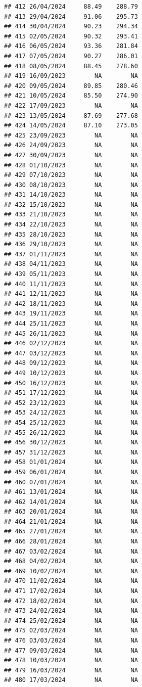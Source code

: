 \documentclass[
]{article}
\begin{document}
\begin{verbatim}
## 412 26/04/2024     88.49    288.79
## 413 29/04/2024     91.06    295.73
## 414 30/04/2024     90.23    294.34
## 415 02/05/2024     90.32    293.41
## 416 06/05/2024     93.36    281.84
## 417 07/05/2024     90.27    286.01
## 418 08/05/2024     88.45    278.60
## 419 16/09/2023        NA        NA
## 420 09/05/2024     89.85    280.46
## 421 10/05/2024     85.50    274.90
## 422 17/09/2023        NA        NA
## 423 13/05/2024     87.69    277.68
## 424 14/05/2024     87.10    273.05
## 425 23/09/2023        NA        NA
## 426 24/09/2023        NA        NA
## 427 30/09/2023        NA        NA
## 428 01/10/2023        NA        NA
## 429 07/10/2023        NA        NA
## 430 08/10/2023        NA        NA
## 431 14/10/2023        NA        NA
## 432 15/10/2023        NA        NA
## 433 21/10/2023        NA        NA
## 434 22/10/2023        NA        NA
## 435 28/10/2023        NA        NA
## 436 29/10/2023        NA        NA
## 437 01/11/2023        NA        NA
## 438 04/11/2023        NA        NA
## 439 05/11/2023        NA        NA
## 440 11/11/2023        NA        NA
## 441 12/11/2023        NA        NA
## 442 18/11/2023        NA        NA
## 443 19/11/2023        NA        NA
## 444 25/11/2023        NA        NA
## 445 26/11/2023        NA        NA
## 446 02/12/2023        NA        NA
## 447 03/12/2023        NA        NA
## 448 09/12/2023        NA        NA
## 449 10/12/2023        NA        NA
## 450 16/12/2023        NA        NA
## 451 17/12/2023        NA        NA
## 452 23/12/2023        NA        NA
## 453 24/12/2023        NA        NA
## 454 25/12/2023        NA        NA
## 455 26/12/2023        NA        NA
## 456 30/12/2023        NA        NA
## 457 31/12/2023        NA        NA
## 458 01/01/2024        NA        NA
## 459 06/01/2024        NA        NA
## 460 07/01/2024        NA        NA
## 461 13/01/2024        NA        NA
## 462 14/01/2024        NA        NA
## 463 20/01/2024        NA        NA
## 464 21/01/2024        NA        NA
## 465 27/01/2024        NA        NA
## 466 28/01/2024        NA        NA
## 467 03/02/2024        NA        NA
## 468 04/02/2024        NA        NA
## 469 10/02/2024        NA        NA
## 470 11/02/2024        NA        NA
## 471 17/02/2024        NA        NA
## 472 18/02/2024        NA        NA
## 473 24/02/2024        NA        NA
## 474 25/02/2024        NA        NA
## 475 02/03/2024        NA        NA
## 476 03/03/2024        NA        NA
## 477 09/03/2024        NA        NA
## 478 10/03/2024        NA        NA
## 479 16/03/2024        NA        NA
## 480 17/03/2024        NA        NA

\end{verbatim}
\end{document}
